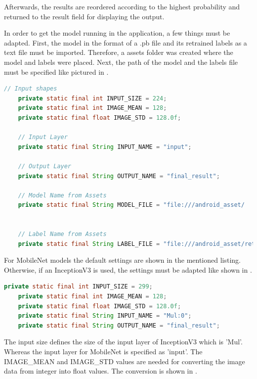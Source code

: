 Afterwards, the results are reordered according to the highest probability and returned to the result field for displaying the output.

In order to get the model running in the application, a few things must be adapted. First, the model in the format of a .pb file and its retrained labels as a text file must be imported. Therefore, a assets folder was created where the model and labels were placed. Next, the path of the model and the labels file must be specified like pictured in .

\begin{lstlisting}[caption=Including the model in the mobile application, label=list:include_model, language=java]
    // Input shapes
    private static final int INPUT_SIZE = 224;
    private static final int IMAGE_MEAN = 128;
    private static final float IMAGE_STD = 128.0f;

    // Input Layer
    private static final String INPUT_NAME = "input";

    // Output Layer
    private static final String OUTPUT_NAME = "final_result";

    // Model Name from Assets
    private static final String MODEL_FILE = "file:///android_asset/				opt4_retrained_dog_graph_mobilenet_0.50_224_700_0.007.pb";


    // Label Name from Assets
    private static final String LABEL_FILE = "file:///android_asset/retrained_dog_labels_mobilenet_0.50_224_700_0.007.txt";

\end{lstlisting}

For MobileNet models the default settings are shown in the mentioned listing. Otherwise, if an InceptionV3 is used, the settings must be adapted like shown in .

\begin{lstlisting}[caption=Setup for InceptionV3, label=list:include_inception, language=java]
    private static final int INPUT_SIZE = 299;
    private static final int IMAGE_MEAN = 128;
    private static final float IMAGE_STD = 128.0f;
    private static final String INPUT_NAME = "Mul:0";
    private static final String OUTPUT_NAME = "final_result";
\end{lstlisting}

The input size defines the size of the input layer of InceptionV3 which is 'Mul'. Whereas the input layer for MobileNet is specified as 'input'. The IMAGE_MEAN and IMAGE_STD values are needed for converting the image data from integer into float values. The conversion is shown in .

